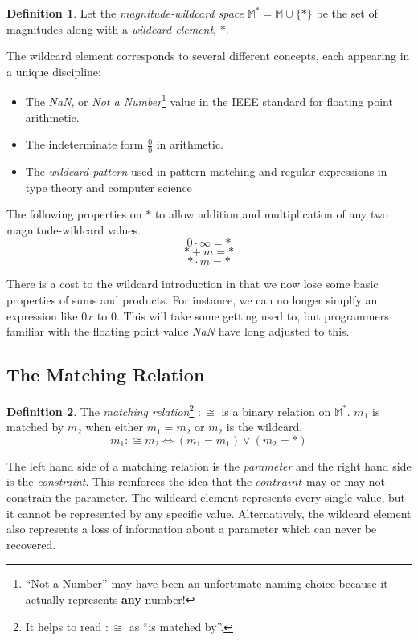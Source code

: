 \documentclass[twoside]{article}
\newcommand{\quotes}[1]{``#1''}
\theoremstyle{plain}%
\theoremstyle{definition}
\newtheorem{definition}{Definition}[section]
\theoremstyle{remark}
\begin{document}
\begin{definition}
Let the \textit{magnitude-wildcard space} \(\mathbb{M}^*= \mathbb{M} \cup \{\ast\}\) be the set of magnitudes along with a \textit{wildcard element}, \(\ast\).
\end{definition}

The wildcard element corresponds to several different concepts, each appearing in a unique discipline:
\begin{itemize}
  \item The \textit{NaN}, or \textit{Not a Number}\footnote{\quotes{Not a Number} may have been an unfortunate naming choice because it actually represents \textbf{any} number!} value in the IEEE standard for floating point arithmetic\cite{ieee}.
  \item The indeterminate form \(\frac{0}{0}\) in arithmetic.
  \item The \textit{wildcard pattern} used in pattern matching and regular expressions in type theory and computer science
\end{itemize}

The following properties on \(\ast\) to allow addition and multiplication of any two magnitude-wildcard values.
\[0 \cdot \infty = \ast\]
\[\ast + m = \ast\]
\[\ast \cdot m = \ast\]

There is a cost to the wildcard introduction in that we now lose some basic properties of sums and products. For instance, we can no longer simplfy an expression like \(0x\) to \(0\). This will take some getting used to, but programmers familiar with the floating point value \textit{NaN} have long adjusted to this.

\subsection{The Matching Relation}

\begin{definition}
The \textit{matching relation}\footnote{It helps to read \(:\cong\) as \quotes{is matched by}.} \(:\cong\) is a binary relation on \(\mathbb{M}^*\). \(m_1\) is matched by \(m_2\) when either \(m_1 = m_2\) or  \(m_2\) is the wildcard.
\[m_1 :\cong m_2 \Longleftrightarrow (m_1 = m_1) \vee (m_2 = \ast)\]
\end{definition}

The left hand side of a matching relation is the \textit{parameter} and the right hand side is the \textit{constraint}. This reinforces the idea that the \(contraint\) may or may not constrain the parameter. The wildcard element represents every single value, but it cannot be represented by any specific value. Alternatively, the wildcard element also represents a loss of information about a parameter which can never be recovered.
\end{document}
